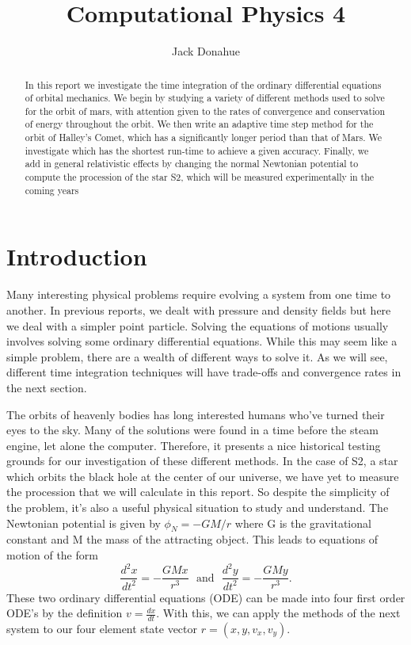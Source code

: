 \documentclass{article}
\title{Computational Physics 4}
\author{Jack Donahue}
\begin{document}
\maketitle

\begin{abstract}
In this report we investigate the time integration of the ordinary differential equations of orbital mechanics. We begin by studying a variety of different methods used to solve for the orbit of mars, with attention given to the rates of convergence and conservation of energy throughout the orbit. We then write an adaptive time step method for the orbit of Halley's Comet, which has a significantly longer period than that of Mars. We investigate which has the shortest run-time to achieve a given accuracy. Finally, we add in general relativistic effects by  changing the normal Newtonian potential to compute the procession of the star S2, which will be measured experimentally in the coming years
\end{abstract}
\section*{Introduction}
Many interesting physical problems require evolving a system from one time to another. In previous reports, we dealt with pressure and density fields but here we deal with a simpler point particle. Solving the equations of motions usually involves solving some ordinary differential equations. While this may seem like a simple problem, there are a wealth of different ways to solve it. As we will see, different time integration techniques will have trade-offs and convergence rates  in the next section.

The orbits of heavenly bodies has long interested humans who've turned their eyes to the sky. Many of the solutions were found in a time before the steam engine, let alone the computer. Therefore, it presents a nice historical testing grounds for our investigation of these different methods. In the case of S2, a star which orbits the black hole at the center of our universe, we have yet to measure the procession that we will calculate in this report. So despite the simplicity of the problem, it's also a useful physical situation to study and understand. The Newtonian potential is given by $\phi_N = -GM/r$ where G is the gravitational constant and M the mass of the attracting object. This leads to equations of motion of the form
\begin{equation}
  \frac{d^2x}{dt^2}=-\frac{GM x}{r^3} \,\,\,\, \mbox{and} \,\,\,\, \frac{d^2y}{dt^2}  = - \frac{GM y }{r^3}.
\end{equation}
These two ordinary differential equations (ODE) can be made into four first order ODE's by the definition $v=\frac{dx}{dt}$. With this, we can apply the methods of the next system to our four element state vector $r = (x,y,v_x,v_y)$.
\end{document}

